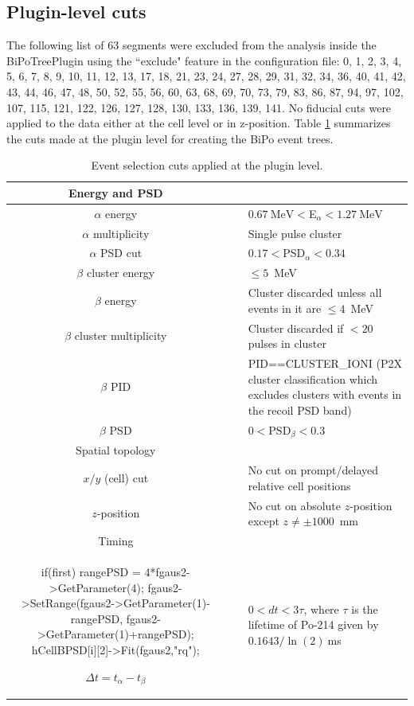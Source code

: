 \subsection{Plugin-level cuts}
The following list of 63 segments were excluded from the analysis inside the BiPoTreePlugin using the ``exclude" feature in the configuration file: 0, 1, 2, 3, 4, 5, 6, 7, 8, 9, 10, 11, 12, 13, 17, 18, 21, 23, 24, 27, 28, 29, 31, 32, 34, 36, 40, 41, 42, 43, 44, 46, 47, 48, 50, 52, 55, 56, 60, 63, 68, 69, 70, 73, 79, 83, 86, 87, 94, 97, 102, 107, 115, 121, 122, 126, 127, 128, 130, 133, 136, 139, 141. No fiducial cuts were applied to the data either at the cell level or in z-position.
Table \ref{tab:plugincuts} summarizes the cuts made at the plugin level for creating the BiPo event trees.
\begin{table}
\begin{center}
\caption{\label{tab:plugincuts}Event selection cuts applied at the plugin level.}
\begin{tabular}[ht]{c c p{10.5cm}}\hline
Energy and PSD&~&~\\\hline\hline
$\alpha$ energy &\vline& $0.67~\textrm{MeV}<$E$_{\alpha}<1.27~\textrm{MeV}$\\
$\alpha$ multiplicity &\vline& Single pulse cluster\\
$\alpha$ PSD cut& \vline&$0.17<$PSD$_{\alpha}<0.34$\\
$\beta$ cluster energy &\vline& $\leq 5$~MeV\\
$\beta$ energy & \vline&Cluster discarded unless all events in it are $\leq 4$~MeV\\
$\beta$ cluster multiplicity & \vline&Cluster discarded if $<20$ pulses in cluster\\
$\beta$ PID & \vline&PID==CLUSTER\_IONI (P2X cluster classification which excludes clusters with events in the recoil PSD band)\\
$\beta$ PSD & \vline&$0<\textrm{PSD}_{\beta}<0.3$\\\hline
Spatial topology&~&~\\\hline\hline
$x/y$ (cell) cut &\vline& No cut on prompt/delayed relative cell positions\\
$z$-position&\vline& No cut on absolute $z$-position except $z\neq \pm1000$~mm\\
Timing&~&~\\\hline\hline	if(first){
	rangePSD = 4*fgaus2->GetParameter(4);
	fgaus2->SetRange(fgaus2->GetParameter(1)-rangePSD,
	fgaus2->GetParameter(1)+rangePSD);
	hCellBPSD[i][2]->Fit(fgaus2,"rq");
}

$\Delta t=t_{\alpha}-t_{\beta}$&\vline &$0< dt < 3\tau$, where $\tau$ is the lifetime of Po-214 given by $0.1643/\ln{(2)}~$ms\\\hline

\end{tabular}
\end{center}
\end{table}

